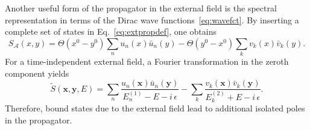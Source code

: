 %
Another useful form of the propagator in the external field is the spectral representation in terms of the Dirac wave functions~\eqref{eq:wavefct}. By inserting a complete set of states in Eq.~\eqref{eq:extpropdef}, one obtains
\begin{equation}
S_\mathcal{A}(x,y)=\Theta(x^0-y^0) \sum_n u_n(x)\bar{u}_n(y)
-\Theta(y^0-x^0)\sum_k v_k(x)\bar{v}_k(y).
\end{equation}
For a time-independent external field, a Fourier transformation in the zeroth component yields
\begin{equation}
\tilde{S}(\mathbf{x},\mathbf{y},E)= \sum_n \frac{u_n(\mathbf{x})\bar{u}_n(\mathbf{y})}{E^{(1)}_n -E -i\,\epsilon}
-\sum_k \frac{v_k(\mathbf{x})\bar{v}_k(\mathbf{y})}{E^{(2)}_k +E -i\,\epsilon}.
\label{eq:spectralrep}
\end{equation}
Therefore, bound states due to the external field lead to additional isolated poles in the propagator.

